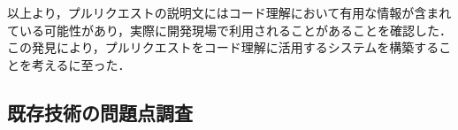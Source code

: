 







以上より，プルリクエストの説明文にはコード理解において有用な情報が含まれている可能性があり，実際に開発現場で利用されることがあることを確認した．
この発見により，プルリクエストをコード理解に活用するシステムを構築することを考えるに至った．


\subsection{既存技術の問題点調査}

